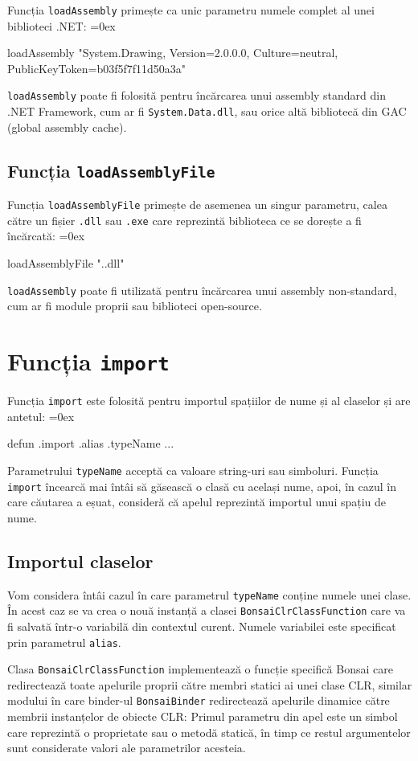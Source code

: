\documentclass[12pt,a4paper]{memoir}
\renewcommand{\c}{\texttt}
\newenvironment{code}
{
\definecolor{shadecolor}{gray}{0.91}
\topsep=0ex
\relax
\shaded
\verbatim
}
{
\endverbatim
\endshaded
}
\begin{document}
Funcția \c{loadAssembly} primește ca unic parametru numele complet al unei biblioteci .NET:
\begin{code}
loadAssembly "System.Drawing, Version=2.0.0.0, Culture=neutral, 
              PublicKeyToken=b03f5f7f11d50a3a"
\end{code}
\c{loadAssembly} poate fi folosită pentru încărcarea unui assembly standard din .NET Framework, cum ar fi \c{System.Data.dll}, sau orice altă bibliotecă din GAC (global assembly cache).

\subsection{Funcția \c{loadAssemblyFile}}
Funcția \c{loadAssemblyFile} primește de asemenea un singur parametru, calea către un fișier \c{.dll} sau \c{.exe} care reprezintă biblioteca ce se dorește a fi încărcată:
\begin{code}
loadAssemblyFile ".\Lib\MyLibrary.dll"
\end{code}
\c{loadAssembly} poate fi utilizată pentru încărcarea unui assembly non-standard, cum ar fi module proprii sau biblioteci open-source.

\section{Funcția \c{import}}

Funcția \c{import} este folosită pentru importul spațiilor de nume și al claselor și are antetul:
\begin{code}
defun .import .alias .typeName { ... }
\end{code}
Parametrului \c{typeName} acceptă ca valoare string-uri sau simboluri. Funcția \c{import} încearcă mai întâi să găsească o clasă cu același nume, apoi, în cazul în care căutarea a eșuat, consideră că apelul reprezintă importul unui spațiu de nume.

\subsection{Importul claselor}

Vom considera întâi cazul în care parametrul \c{typeName} conține numele unei clase. În acest caz se va crea o nouă instanță a clasei \c{BonsaiClrClassFunction} care va fi salvată într-o variabilă din contextul curent. Numele variabilei este specificat prin parametrul \c{alias}. 

Clasa \c{BonsaiClrClassFunction} implementează o funcție specifică Bonsai care redirectează toate apelurile proprii către membri statici ai unei clase CLR, similar modului în care binder-ul \c{BonsaiBinder} redirectează apelurile dinamice către membrii instanțelor de obiecte CLR: Primul parametru din apel este un simbol care reprezintă o proprietate sau o metodă statică, în timp ce restul argumentelor sunt considerate valori ale parametrilor acesteia. 
\end{document}
